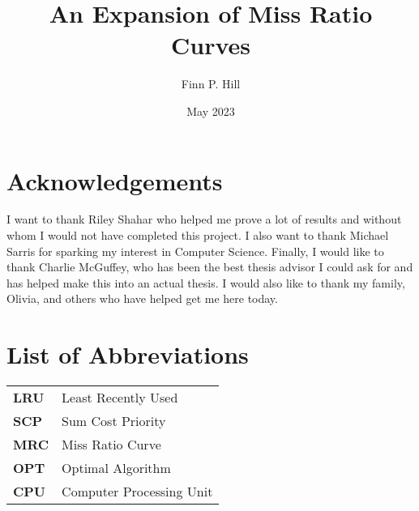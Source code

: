 \documentclass[12pt,twoside]{reedthesis}
\title{An Expansion of Miss Ratio Curves}
\author{Finn P. Hill}
\date{May 2023}
\begin{document}
  \maketitle
  \frontmatter %
  \pagestyle{empty} %

    \chapter*{Acknowledgements}
	I want to thank Riley Shahar who helped me prove a lot of results and without whom I would not have completed this project. I also want to thank Michael Sarris for sparking my interest in Computer Science. Finally, I would like to thank Charlie McGuffey, who has been the best thesis advisor I could ask for and has helped make this into an actual thesis. I would also like to thank my family, Olivia, and others who have helped get me here today. 

	

    \chapter*{List of Abbreviations}

	\begin{table}[H]
	\centering %
	\begin{tabular}{ll}
		\textbf{LRU}  	&  Least Recently Used \\
		\textbf{SCP}  	&  Sum Cost Priority\\
		\textbf{MRC}  	&  Miss Ratio Curve \\
		\textbf{OPT}  	&  Optimal Algorithm\\
        \textbf{CPU}  	&  Computer Processing Unit\\
	\end{tabular}
	\end{table}
	

    \tableofcontents
    \listoffigures

\end{document}
